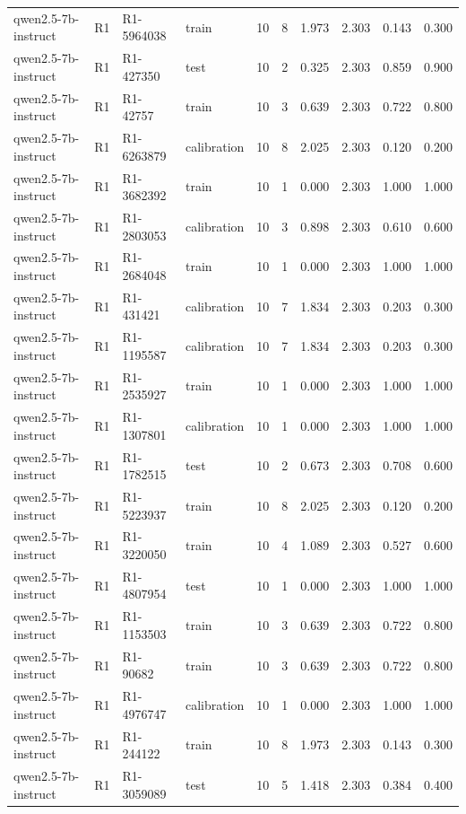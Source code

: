 \begin{table}
\begin{tabular}{llllrrrrrr}
qwen2.5-7b-instruct & R1 & R1-5964038 & train & 10 & 8 & 1.973 & 2.303 & 0.143 & 0.300 \\
qwen2.5-7b-instruct & R1 & R1-427350 & test & 10 & 2 & 0.325 & 2.303 & 0.859 & 0.900 \\
qwen2.5-7b-instruct & R1 & R1-42757 & train & 10 & 3 & 0.639 & 2.303 & 0.722 & 0.800 \\
qwen2.5-7b-instruct & R1 & R1-6263879 & calibration & 10 & 8 & 2.025 & 2.303 & 0.120 & 0.200 \\
qwen2.5-7b-instruct & R1 & R1-3682392 & train & 10 & 1 & 0.000 & 2.303 & 1.000 & 1.000 \\
qwen2.5-7b-instruct & R1 & R1-2803053 & calibration & 10 & 3 & 0.898 & 2.303 & 0.610 & 0.600 \\
qwen2.5-7b-instruct & R1 & R1-2684048 & train & 10 & 1 & 0.000 & 2.303 & 1.000 & 1.000 \\
qwen2.5-7b-instruct & R1 & R1-431421 & calibration & 10 & 7 & 1.834 & 2.303 & 0.203 & 0.300 \\
qwen2.5-7b-instruct & R1 & R1-1195587 & calibration & 10 & 7 & 1.834 & 2.303 & 0.203 & 0.300 \\
qwen2.5-7b-instruct & R1 & R1-2535927 & train & 10 & 1 & 0.000 & 2.303 & 1.000 & 1.000 \\
qwen2.5-7b-instruct & R1 & R1-1307801 & calibration & 10 & 1 & 0.000 & 2.303 & 1.000 & 1.000 \\
qwen2.5-7b-instruct & R1 & R1-1782515 & test & 10 & 2 & 0.673 & 2.303 & 0.708 & 0.600 \\
qwen2.5-7b-instruct & R1 & R1-5223937 & train & 10 & 8 & 2.025 & 2.303 & 0.120 & 0.200 \\
qwen2.5-7b-instruct & R1 & R1-3220050 & train & 10 & 4 & 1.089 & 2.303 & 0.527 & 0.600 \\
qwen2.5-7b-instruct & R1 & R1-4807954 & test & 10 & 1 & 0.000 & 2.303 & 1.000 & 1.000 \\
qwen2.5-7b-instruct & R1 & R1-1153503 & train & 10 & 3 & 0.639 & 2.303 & 0.722 & 0.800 \\
qwen2.5-7b-instruct & R1 & R1-90682 & train & 10 & 3 & 0.639 & 2.303 & 0.722 & 0.800 \\
qwen2.5-7b-instruct & R1 & R1-4976747 & calibration & 10 & 1 & 0.000 & 2.303 & 1.000 & 1.000 \\
qwen2.5-7b-instruct & R1 & R1-244122 & train & 10 & 8 & 1.973 & 2.303 & 0.143 & 0.300 \\
qwen2.5-7b-instruct & R1 & R1-3059089 & test & 10 & 5 & 1.418 & 2.303 & 0.384 & 0.400 \\

\end{tabular}
\end{table}
